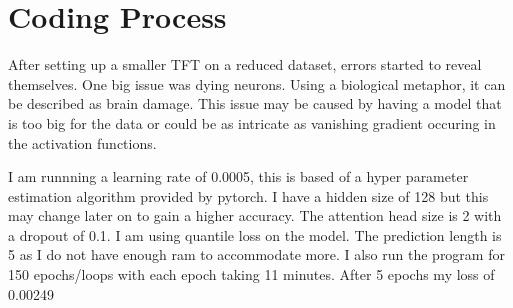 \documentclass{article}
\begin{document}
\section{Coding Process}

After setting up a smaller TFT on a reduced dataset, errors started to reveal
themselves. One big issue was dying neurons. Using a biological metaphor, it can be
described as brain damage. This issue may be caused by having a model that is too
big for the data or could be as intricate as vanishing gradient occuring in the
activation functions.

I am runnning a learning rate of 0.0005, this is based of a hyper parameter estimation
algorithm provided by pytorch. I have a hidden size of 128 but this may change later
on to gain a higher accuracy. The attention head size is 2 with a dropout of 0.1.
I am using quantile loss on the model. The prediction length is 5 as I do not have
enough ram to accommodate more. I also run the program for 150 epochs/loops with each
epoch taking 11 minutes.
After 5 epochs my loss of 0.00249
\clearpage
\end{document}
